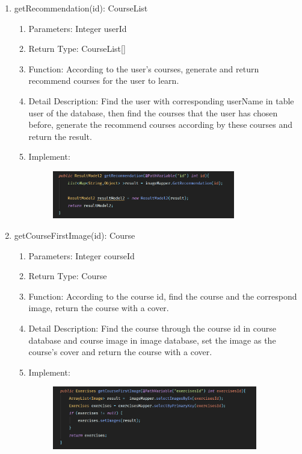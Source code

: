\documentclass[16pt]{scrreprt}
\begin{document}
\begin{enumerate}
    
    \item getRecommendation(id): CourseList
    \begin{enumerate}
        \item Parameters: Integer userId
        \item Return Type: CourseList[]
        \item Function: According to the user's courses, generate and return recommend courses for the user to learn.
        \item Detail Description: Find the user with corresponding userName in table user of the database, then find the courses that the user has chosen before, generate the recommend courses according by these courses and return the result.
        \item Implement:
        \begin{figure}[H]
    \centering
    \includegraphics[width=0.8\textwidth]{diagrams/getRecommendation.png}\\
\end{figure}
    \end{enumerate}
    \item getCourseFirstImage(id): Course
    \begin{enumerate}
        \item Parameters: Integer courseId
        \item Return Type: Course
        \item Function: According to the course id, find the course and the correspond image, return the course with a cover.
        \item Detail Description: Find the course through the course id in course database and course image in image database, set the image as the course's cover and return the course with a cover.
        \item Implement:
        \begin{figure}[H]
    \centering
    \includegraphics[width=0.9\textwidth]{diagrams/getCourseFirstImage.png}\\

\end{figure}
\end{enumerate}
\end{enumerate}
\end{document}
